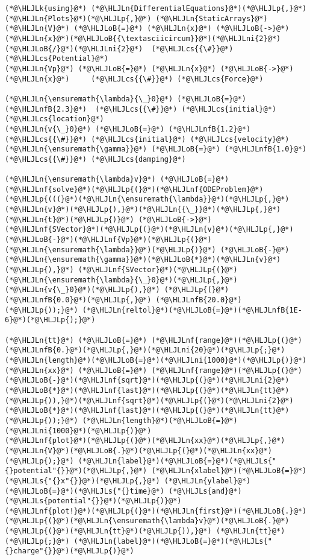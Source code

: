 \documentclass[12pt,a4paper]{article}
\newcommand{\HLJLk}[1]{\textcolor[RGB]{148,91,176}{\textbf{#1}}}
\newcommand{\HLJLn}[1]{#1}
\newcommand{\HLJLnf}[1]{\textcolor[RGB]{66,102,213}{#1}}
\newcommand{\HLJLs}[1]{\textcolor[RGB]{201,61,57}{#1}}
\newcommand{\HLJLnfB}[1]{\textcolor[RGB]{59,151,46}{#1}}
\newcommand{\HLJLni}[1]{\textcolor[RGB]{59,151,46}{#1}}
\newcommand{\HLJLoB}[1]{\textcolor[RGB]{102,102,102}{\textbf{#1}}}
\newcommand{\HLJLp}[1]{#1}
\newcommand{\HLJLcs}[1]{\textcolor[RGB]{153,153,119}{\textit{#1}}}
\begin{document}
\begin{lstlisting}
(*@\HLJLk{using}@*) (*@\HLJLn{DifferentialEquations}@*)(*@\HLJLp{,}@*) (*@\HLJLn{Plots}@*)(*@\HLJLp{,}@*) (*@\HLJLn{StaticArrays}@*)
(*@\HLJLn{V}@*) (*@\HLJLoB{=}@*) (*@\HLJLn{x}@*) (*@\HLJLoB{->}@*) (*@\HLJLn{x}@*)(*@\HLJLoB{{\textasciicircum}}@*)(*@\HLJLni{2}@*)(*@\HLJLoB{/}@*)(*@\HLJLni{2}@*)  (*@\HLJLcs{{\#}}@*) (*@\HLJLcs{Potential}@*)
(*@\HLJLn{Vp}@*) (*@\HLJLoB{=}@*) (*@\HLJLn{x}@*) (*@\HLJLoB{->}@*) (*@\HLJLn{x}@*)     (*@\HLJLcs{{\#}}@*) (*@\HLJLcs{Force}@*)

(*@\HLJLn{\ensuremath{\lambda}{\_}0}@*) (*@\HLJLoB{=}@*) (*@\HLJLnfB{2.3}@*)  (*@\HLJLcs{{\#}}@*) (*@\HLJLcs{initial}@*) (*@\HLJLcs{location}@*)
(*@\HLJLn{v{\_}0}@*) (*@\HLJLoB{=}@*) (*@\HLJLnfB{1.2}@*)  (*@\HLJLcs{{\#}}@*) (*@\HLJLcs{initial}@*) (*@\HLJLcs{velocity}@*)
(*@\HLJLn{\ensuremath{\gamma}}@*) (*@\HLJLoB{=}@*) (*@\HLJLnfB{1.0}@*)    (*@\HLJLcs{{\#}}@*) (*@\HLJLcs{damping}@*)

(*@\HLJLn{\ensuremath{\lambda}v}@*) (*@\HLJLoB{=}@*) (*@\HLJLnf{solve}@*)(*@\HLJLp{(}@*)(*@\HLJLnf{ODEProblem}@*)(*@\HLJLp{(((}@*)(*@\HLJLn{\ensuremath{\lambda}}@*)(*@\HLJLp{,}@*)(*@\HLJLn{v}@*)(*@\HLJLp{),}@*)(*@\HLJLn{{\_}}@*)(*@\HLJLp{,}@*)(*@\HLJLn{t}@*)(*@\HLJLp{)}@*) (*@\HLJLoB{->}@*) (*@\HLJLnf{SVector}@*)(*@\HLJLp{(}@*)(*@\HLJLn{v}@*)(*@\HLJLp{,}@*)(*@\HLJLoB{-}@*)(*@\HLJLnf{Vp}@*)(*@\HLJLp{(}@*)(*@\HLJLn{\ensuremath{\lambda}}@*)(*@\HLJLp{)}@*) (*@\HLJLoB{-}@*) (*@\HLJLn{\ensuremath{\gamma}}@*)(*@\HLJLoB{*}@*)(*@\HLJLn{v}@*)(*@\HLJLp{),}@*) (*@\HLJLnf{SVector}@*)(*@\HLJLp{(}@*)(*@\HLJLn{\ensuremath{\lambda}{\_}0}@*)(*@\HLJLp{,}@*)(*@\HLJLn{v{\_}0}@*)(*@\HLJLp{),}@*) (*@\HLJLp{(}@*)(*@\HLJLnfB{0.0}@*)(*@\HLJLp{,}@*) (*@\HLJLnfB{20.0}@*)(*@\HLJLp{));}@*) (*@\HLJLn{reltol}@*)(*@\HLJLoB{=}@*)(*@\HLJLnfB{1E-6}@*)(*@\HLJLp{);}@*)

(*@\HLJLn{tt}@*) (*@\HLJLoB{=}@*) (*@\HLJLnf{range}@*)(*@\HLJLp{(}@*)(*@\HLJLnfB{0.}@*)(*@\HLJLp{,}@*)(*@\HLJLni{20}@*)(*@\HLJLp{;}@*) (*@\HLJLn{length}@*)(*@\HLJLoB{=}@*)(*@\HLJLni{1000}@*)(*@\HLJLp{)}@*)
(*@\HLJLn{xx}@*) (*@\HLJLoB{=}@*) (*@\HLJLnf{range}@*)(*@\HLJLp{(}@*)(*@\HLJLoB{-}@*)(*@\HLJLnf{sqrt}@*)(*@\HLJLp{(}@*)(*@\HLJLni{2}@*)(*@\HLJLoB{*}@*)(*@\HLJLnf{last}@*)(*@\HLJLp{(}@*)(*@\HLJLn{tt}@*)(*@\HLJLp{)),}@*)(*@\HLJLnf{sqrt}@*)(*@\HLJLp{(}@*)(*@\HLJLni{2}@*)(*@\HLJLoB{*}@*)(*@\HLJLnf{last}@*)(*@\HLJLp{(}@*)(*@\HLJLn{tt}@*)(*@\HLJLp{));}@*) (*@\HLJLn{length}@*)(*@\HLJLoB{=}@*)(*@\HLJLni{1000}@*)(*@\HLJLp{)}@*)
(*@\HLJLnf{plot}@*)(*@\HLJLp{(}@*)(*@\HLJLn{xx}@*)(*@\HLJLp{,}@*) (*@\HLJLn{V}@*)(*@\HLJLoB{.}@*)(*@\HLJLp{(}@*)(*@\HLJLn{xx}@*)(*@\HLJLp{);}@*) (*@\HLJLn{label}@*)(*@\HLJLoB{=}@*)(*@\HLJLs{"{}potential"{}}@*)(*@\HLJLp{,}@*) (*@\HLJLn{xlabel}@*)(*@\HLJLoB{=}@*)(*@\HLJLs{"{}x"{}}@*)(*@\HLJLp{,}@*) (*@\HLJLn{ylabel}@*)(*@\HLJLoB{=}@*)(*@\HLJLs{"{}time}@*) (*@\HLJLs{and}@*) (*@\HLJLs{potential"{}}@*)(*@\HLJLp{)}@*)
(*@\HLJLnf{plot!}@*)(*@\HLJLp{(}@*)(*@\HLJLn{first}@*)(*@\HLJLoB{.}@*)(*@\HLJLp{(}@*)(*@\HLJLn{\ensuremath{\lambda}v}@*)(*@\HLJLoB{.}@*)(*@\HLJLp{(}@*)(*@\HLJLn{tt}@*)(*@\HLJLp{)),}@*) (*@\HLJLn{tt}@*)(*@\HLJLp{;}@*) (*@\HLJLn{label}@*)(*@\HLJLoB{=}@*)(*@\HLJLs{"{}charge"{}}@*)(*@\HLJLp{)}@*)
\end{lstlisting}
\end{document}
